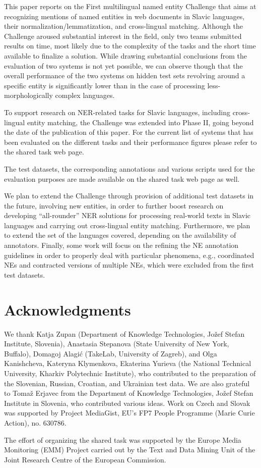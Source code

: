 \documentclass[11pt]{article}
\begin{document}
This paper reports on the First multilingual named entity Challenge that
aims at recognizing mentions of named entities in web documents in Slavic
languages, their normalization/lemmatization, and cross-lingual matching.
Although the Challenge aroused substantial interest in the field, only
two teams submitted results on time, most likely due to the complexity of
the tasks and the short time available to finalize a solution.  While
drawing substantial conclusions from the evaluation of two systems is not
yet possible, we can observe though that the overall performance of the
two systems on hidden test sets revolving around a specific entity is
significantly lower than in the case of processing less-morphologically
complex languages.

To support research on NER-related tasks for Slavic languages, including
cross-lingual entity matching, the Challenge was extended into Phase II,
going beyond the date of the publication of this paper.  For the current
list of systems that has been evaluated on the different tasks and their
performance figures please refer to the shared task web page.

The test datasets, the corresponding annotations and various scripts used
for the evaluation purposes are made available on the shared task web
page as well.

We plan to extend the Challenge through provision of additional test
datasets in the future, involving new entities, in order to further boost
research on developing ``all-rounder'' NER solutions for processing
real-world texts in Slavic languages and carrying out cross-lingual
entity matching.  Furthermore, we plan to extend the set of the languages
covered, depending on the availability of annotators.  Finally, some work
will focus on the refining the NE annotation guidelines in order to
properly deal with particular phenomena, e.g., coordinated NEs and
contracted versions of multiple NEs, which were excluded from the first
test datasets.


\section*{Acknowledgments}


We thank Katja Zupan (Department of Knowledge Technologies, Jožef Stefan
Institute, Slovenia), Anastasia Stepanova (State University of New York,
Buffalo), Domagoj Alagić (TakeLab, University of Zagreb), and Olga
Kanishcheva, Kateryna Klymenkova, Ekaterina Yurieva (the National
Technical University, Kharkiv Polytechnic Institute), who contributed to
the preparation of the Slovenian, Russian, Croatian, and Ukrainian test
data.  
%
We are also grateful to Tomaž Erjavec from the Department of Knowledge
Technologies, Jožef Stefan Institute in Slovenia, who contributed various
ideas.
%
Work on Czech and Slovak was supported by Project MediaGist, EU's FP7
People Programme (Marie Curie Action), no. 630786.

The effort of organizing the shared task was supported by the Europe Media Monitoring (EMM) 
Project carried out by the Text and Data Mining Unit of the Joint Research Centre of the 
European Commission.



\end{document}
